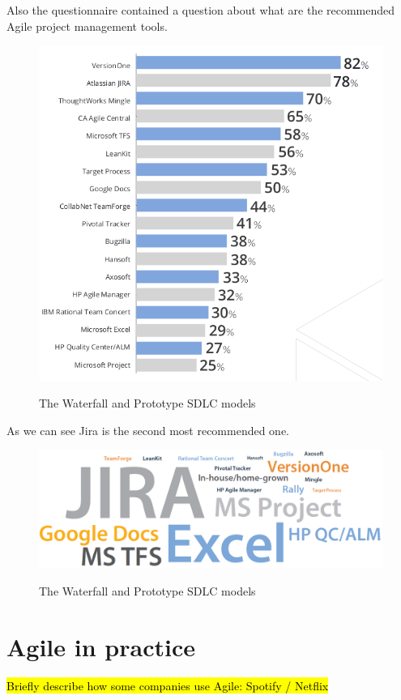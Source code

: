 	Also the questionnaire contained a question about what are the recommended Agile project management tools.
	
	\begin{figure}[H]
		\centering
		\includegraphics[width=.8\textwidth]{resources/Screenshot}\\
		\caption{The Waterfall and Prototype SDLC models}
	\end{figure}

	As we can see Jira is the second most recommended one.

	\begin{figure}[H]
		\centering
		\includegraphics[width=.8\textwidth]{resources/Untitled_4}\\
		\caption{The Waterfall and Prototype SDLC models}
	\end{figure}

\section{Agile in practice}
\hl{Briefly describe how some companies use Agile: Spotify / Netflix}


